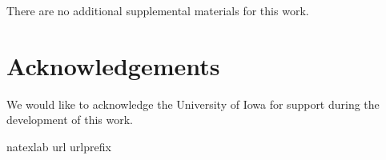 \documentclass[12pt]{article} %
\theoremstyle{definition}
\begin{document}
There are no additional supplemental materials for this work.
\par
\section*{Acknowledgements}

We would like to acknowledge the University of Iowa for support during the development of this work.
\par



\bibhang=1.7pc
\bibsep=2pt
\fontsize{9}{14pt plus.8pt minus .6pt}\selectfont
\renewcommand\bibname{\large \bf References}
\expandafter\ifx\csname
natexlab\endcsname\relax\def\natexlab#1{#1}\fi
\expandafter\ifx\csname url\endcsname\relax
  \def\url#1{\texttt{#1}}\fi
\expandafter\ifx\csname urlprefix\endcsname\relax\def\urlprefix{URL}\fi



\end{document}
